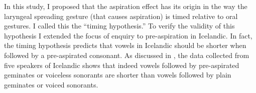 \documentclass[11pt,a4paper,openany]{memoir}\usepackage[]{graphicx}\usepackage[]{color}
\begin{document}
In this study, I proposed that the aspiration effect has its origin in the way the laryngeal spreading gesture (that causes aspiration) is timed relative to oral gestures.
I called this the ``timing hypothesis.''
To verify the validity of this hypothesis I extended the focus of enquiry to pre-aspiration in Icelandic.
In fact, the timing hypothesis predicts that vowels in Icelandic should be shorter when followed by a pre-aspirated consonant.
As discussed in , the data collected from five speakers of Icelandic shows that indeed vowels followed by pre-aspirated geminates or voiceless sonorants are shorter than vowels followed by plain geminates or voiced sonorants.












\appendix








\end{document}
